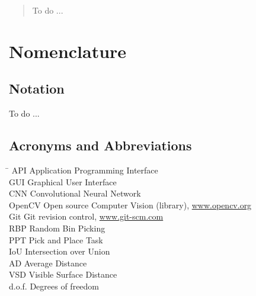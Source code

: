 \begin{abstract}
To do ... 
\end{abstract}

\chapter*{Nomenclature}\label{ch:symbols}

\section*{Notation}
\label{sec:notation}

To do ...

\section*{Acronyms and Abbreviations}
\label{sec:acronyms}

\begin{tabbing}
	\hspace*{3.5cm}		\= \kill
	API \> Application Programming Interface \\[1ex]
	GUI \> Graphical User Interface \\[1ex]
	CNN \> Convolutional Neural Network\\[1ex]
	OpenCV  \> Open source Computer Vision (library), \url{www.opencv.org} \\[1ex]
	Git  \> Git revision control, \url{www.git-scm.com} \\[1ex]
	RBP  \> Random Bin Picking \\[1ex]
	PPT  \> Pick and Place Task \\[1ex]
	IoU  \> Intersection over Union \\[1ex]
	AD  \> Average Distance \\[1ex]
	VSD  \> Visible Surface Distance \\[1ex]
	d.o.f.  \> Degrees of freedom \\[1ex]
\end{tabbing}